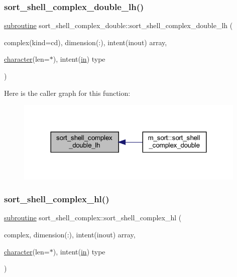 \subsubsection{\texorpdfstring{sort\+\_\+shell\+\_\+complex\+\_\+double\+\_\+lh()}{sort\_shell\_complex\_double\_lh()}}
{\footnotesize\ttfamily \hyperlink{M__stopwatch_83_8txt_acfbcff50169d691ff02d4a123ed70482}{subroutine} sort\+\_\+shell\+\_\+complex\+\_\+double\+::sort\+\_\+shell\+\_\+complex\+\_\+double\+\_\+lh (\begin{DoxyParamCaption}\item[{complex(kind=cd), dimension(\+:), intent(inout)}]{array,  }\item[{\hyperlink{option__stopwatch_83_8txt_abd4b21fbbd175834027b5224bfe97e66}{character}(len=$\ast$), intent(\hyperlink{M__journal_83_8txt_afce72651d1eed785a2132bee863b2f38}{in})}]{type }\end{DoxyParamCaption})\hspace{0.3cm}{\ttfamily [private]}}

Here is the caller graph for this function\+:
\nopagebreak
\begin{figure}[H]
\begin{center}
\leavevmode
\includegraphics[width=312pt]{M__sort_8f90_a2910d11c802e6658c33f26b2300a7f90_icgraph}
\end{center}
\end{figure}
\mbox{\label{M__sort_8f90_a6fafc1b948c7b07b66615208dd7fbc23}} 
\subsubsection{\texorpdfstring{sort\+\_\+shell\+\_\+complex\+\_\+hl()}{sort\_shell\_complex\_hl()}}
{\footnotesize\ttfamily \hyperlink{M__stopwatch_83_8txt_acfbcff50169d691ff02d4a123ed70482}{subroutine} sort\+\_\+shell\+\_\+complex\+::sort\+\_\+shell\+\_\+complex\+\_\+hl (\begin{DoxyParamCaption}\item[{complex, dimension(\+:), intent(inout)}]{array,  }\item[{\hyperlink{option__stopwatch_83_8txt_abd4b21fbbd175834027b5224bfe97e66}{character}(len=$\ast$), intent(\hyperlink{M__journal_83_8txt_afce72651d1eed785a2132bee863b2f38}{in})}]{type }\end{DoxyParamCaption})\hspace{0.3cm}{\ttfamily [private]}}

